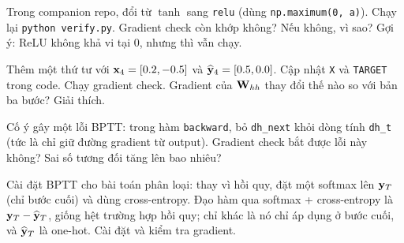 \begin{bt}
  \item Trong companion repo, đổi  từ
    $\tanh$ sang
    \texttt{relu} (dùng \texttt{np.maximum(0, a)}).
    Chạy lại \texttt{python verify.py}. Gradient check còn khớp
    không? Nếu không, vì sao? Gợi ý: ReLU không khả vi tại 0, nhưng
     thì vẫn chạy.

  \item Thêm một  thứ tư với
    $\mathbf{x}_4 = [0.2, -0.5]$ và
    $\widehat{\mathbf{y}}_4 = [0.5, 0.0]$. Cập nhật \texttt{X} và
    \texttt{TARGET} trong code. Chạy gradient check. Gradient
    của $\mathbf{W}_{hh}$ thay đổi thế nào so với bản ba bước? Giải thích.

  \item Cố ý gây một lỗi BPTT: trong hàm \texttt{backward}, bỏ
    \texttt{dh_next} khỏi dòng tính \texttt{dh_t}
    (tức là chỉ giữ đường gradient từ output). Gradient check bắt được lỗi
    này không? Sai số tương đối tăng lên bao nhiêu?

  \item Cài đặt BPTT cho bài toán phân loại: thay vì hồi quy, đặt một softmax
    lên $\mathbf{y}_T$ (chỉ bước cuối) và dùng cross-entropy. Đạo hàm qua
    softmax + cross-entropy là $\mathbf{y}_T - \widehat{\mathbf{y}}_T$, giống hệt
    trường hợp hồi quy; chỉ khác là nó chỉ áp dụng ở bước cuối, và
    $\widehat{\mathbf{y}}_T$ là one-hot. Cài đặt và kiểm tra gradient.
\end{bt}

%

\tierextend

%


